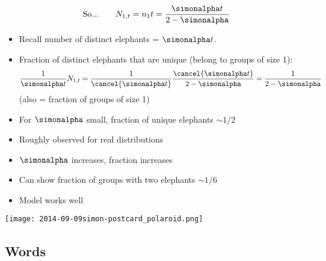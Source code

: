 \begin{frame}

  \begin{block}{}
    $$
    \mbox{So...} \qquad
    N_{1,t} = n_1 t
    = \frac{\simonalpha t}{2-\simonalpha}
    $$
    \begin{itemize}
    \item<2-> Recall number of distinct elephants = $\simonalpha t$.
    \item<3-> Fraction of distinct elephants that are unique
      (belong to groups of size 1):
      $$
      \frac{1}
      {\simonalpha t}
      N_{1,t}
      =
      \frac{1}
      {\cancel{\simonalpha t}}
      \frac{\cancel{\simonalpha t}}{2-\simonalpha}
      = \frac{1}{2-\simonalpha}
      $$
      (also = fraction of groups of size 1)
    \item<4-> 
      For $\simonalpha$ small, fraction of unique elephants $\sim 1/2$
    \item<5-> Roughly observed for real distributions
    \item<6-> $\simonalpha$ increases, fraction increases
    \item<7-> 
      Can show fraction of groups with two elephants $\sim 1/6$
    \item<8-> Model works well 
    \end{itemize}
  \end{block}

\end{frame}

\begin{frame}
  \texttt{[image: 2014-09-09simon-postcard\_polaroid.png]}
\end{frame}


\subsection{Words}

